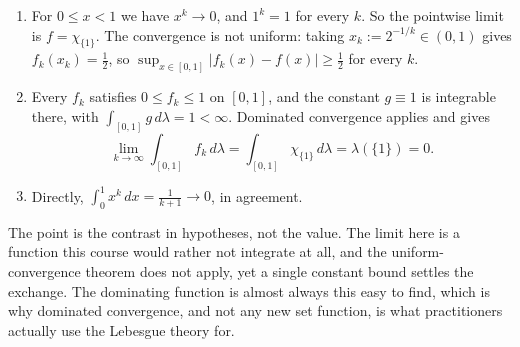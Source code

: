 \begin{exercisesolution}
\label{sol:ai_dominated_beats_uniform}
\begin{enumerate}[label=\textbf{(\alph*)}]
  \item For $0 \le x < 1$ we have $x^k \to 0$, and $1^k = 1$ for every $k$. So the pointwise limit
    is $f = \chi_{\{1\}}$. The convergence is not uniform: taking $x_k := 2^{-1/k} \in (0,1)$ gives
    $f_k(x_k) = \tfrac12$, so
    $\sup_{x\in[0,1]}\lvert f_k(x)-f(x)\rvert \ge \tfrac12$ for every $k$.

  \item Every $f_k$ satisfies $0 \le f_k \le 1$ on $[0,1]$, and the constant $g \equiv 1$ is
    integrable there, with $\int_{[0,1]} g\,d\lambda = 1 < \infty$. Dominated convergence applies
    and gives
    \[\lim_{k\to\infty}\int_{[0,1]} f_k \,d\lambda = \int_{[0,1]} \chi_{\{1\}}\,d\lambda
      = \lambda(\{1\}) = 0.\]

  \item Directly, $\int_0^1 x^k\,dx = \frac{1}{k+1} \to 0$, in agreement.
\end{enumerate}
\begin{remark}
The point is the contrast in hypotheses, not the value. The limit here is a function this course
would rather not integrate at all, and the uniform-convergence theorem does not apply, yet a single
constant bound settles the exchange. The dominating function is almost always this easy to find,
which is why dominated convergence, and not any new set function, is what practitioners actually
use the Lebesgue theory for.
\end{remark}
\end{exercisesolution}

